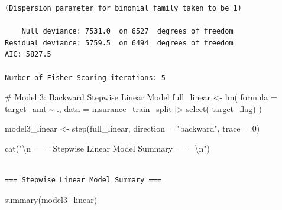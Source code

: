 \documentclass[
  11pt]{article}
\newenvironment{Shaded}{\begin{snugshade}}{\end{snugshade}}
\newcommand{\AttributeTok}[1]{\textcolor[rgb]{0.40,0.45,0.13}{#1}}
\newcommand{\CommentTok}[1]{\textcolor[rgb]{0.37,0.37,0.37}{#1}}
\newcommand{\DecValTok}[1]{\textcolor[rgb]{0.68,0.00,0.00}{#1}}
\newcommand{\FunctionTok}[1]{\textcolor[rgb]{0.28,0.35,0.67}{#1}}
\newcommand{\NormalTok}[1]{\textcolor[rgb]{0.00,0.23,0.31}{#1}}
\newcommand{\OtherTok}[1]{\textcolor[rgb]{0.00,0.23,0.31}{#1}}
\newcommand{\SpecialCharTok}[1]{\textcolor[rgb]{0.37,0.37,0.37}{#1}}
\newcommand{\StringTok}[1]{\textcolor[rgb]{0.13,0.47,0.30}{#1}}
\begin{document}
\begin{verbatim}
(Dispersion parameter for binomial family taken to be 1)

    Null deviance: 7531.0  on 6527  degrees of freedom
Residual deviance: 5759.5  on 6494  degrees of freedom
AIC: 5827.5

Number of Fisher Scoring iterations: 5
\end{verbatim}

\begin{Shaded}
\begin{Highlighting}[]
\CommentTok{\# Model 3: Backward Stepwise Linear Model}
\NormalTok{full\_linear }\OtherTok{\textless{}{-}} \FunctionTok{lm}\NormalTok{(}
    \AttributeTok{formula =}\NormalTok{ target\_amt }\SpecialCharTok{\textasciitilde{}}\NormalTok{ .,}
    \AttributeTok{data =}\NormalTok{ insurance\_train\_split }\SpecialCharTok{|\textgreater{}} \FunctionTok{select}\NormalTok{(}\SpecialCharTok{{-}}\NormalTok{target\_flag)}
\NormalTok{)}

\NormalTok{model3\_linear }\OtherTok{\textless{}{-}} \FunctionTok{step}\NormalTok{(full\_linear, }\AttributeTok{direction =} \StringTok{"backward"}\NormalTok{, }\AttributeTok{trace =} \DecValTok{0}\NormalTok{)}

\FunctionTok{cat}\NormalTok{(}\StringTok{"}\SpecialCharTok{\textbackslash{}n}\StringTok{=== Stepwise Linear Model Summary ===}\SpecialCharTok{\textbackslash{}n}\StringTok{"}\NormalTok{)}
\end{Highlighting}
\end{Shaded}

\begin{verbatim}

=== Stepwise Linear Model Summary ===
\end{verbatim}

\begin{Shaded}
\begin{Highlighting}[]
\FunctionTok{summary}\NormalTok{(model3\_linear)}
\end{Highlighting}
\end{Shaded}
\end{document}
